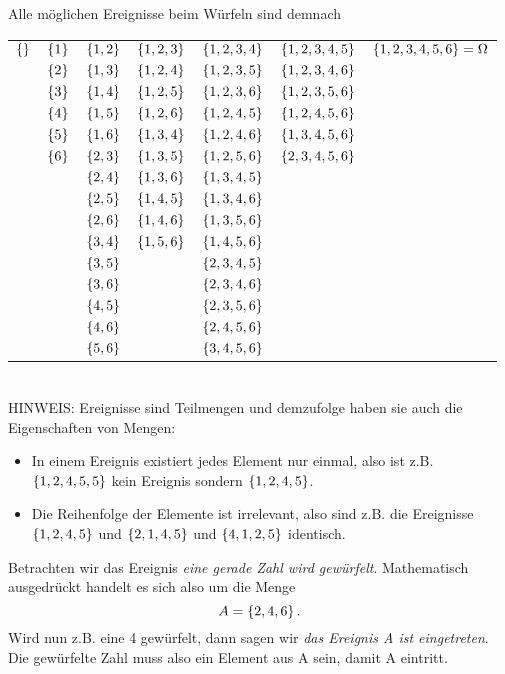 Alle möglichen Ereignisse beim Würfeln sind demnach

\begin{tabular}{ccccccc}\\\hline
$\gkl{}$&$\gkl{1}$& $\gkl{1,2}$ & $\gkl{1,2,3}$ & $\gkl{1,2,3,4}$ &  $\gkl{1,2,3,4,5}$ & $\gkl{1,2,3,4,5,6}=\Omega$\\
	 &$\gkl{2}$ & $\gkl{1,3}$& $\gkl{1,2,4}$& $\gkl{1,2,3,5}$& $\gkl{1,2,3,4,6}$ &\\
	 &$\gkl{3}$ & $\gkl{1,4}$& $\gkl{1,2,5}$& $\gkl{1,2,3,6}$& $\gkl{1,2,3,5,6}$&\\
	 &$\gkl{4}$ & $\gkl{1,5}$& $\gkl{1,2,6}$& $\gkl{1,2,4,5}$& $\gkl{1,2,4,5,6}$&\\
	 &$\gkl{5}$ & $\gkl{1,6}$ & $\gkl{1,3,4}$& $\gkl{1,2,4,6}$& $\gkl{1,3,4,5,6}$&\\ 
	 &$\gkl{6}$ & $\gkl{2,3}$& $\gkl{1,3,5}$& $\gkl{1,2,5,6}$& $\gkl{2,3,4,5,6}$&\\
	 &		 & $\gkl{2,4}$& $\gkl{1,3,6}$& $\gkl{1,3,4,5}$& &\\
	 &		 & $\gkl{2,5}$& $\gkl{1,4,5}$& $\gkl{1,3,4,6}$& &\\
	 &		 & $\gkl{2,6}$& $\gkl{1,4,6}$& $\gkl{1,3,5,6}$ & &\\
	 &		 & $\gkl{3,4}$& $\gkl{1,5,6}$& $\gkl{1,4,5,6}$& &\\ 
	  &		 & $\gkl{3,5}$& 			&$\gkl{2,3,4,5}$ & &\\
	 &		 & $\gkl{3,6}$& 			&$\gkl{2,3,4,6}$ & &\\
	 &		&  $\gkl{4,5}$& 			&$\gkl{2,3,5,6}$ & &\\
	 &		& $\gkl{4,6}$ & 			&$\gkl{2,4,5,6}$ & &\\
	 & 		& $\gkl{5,6}$& 			&$\gkl{3,4,5,6}$& &\\
	 \hline
\end{tabular}
\\

HINWEIS: Ereignisse sind Teilmengen und demzufolge haben sie auch die Eigenschaften von Mengen:
\begin{itemize}
	\item In einem Ereignis existiert jedes Element nur einmal, also ist z.B. $\gkl{1,2,4,5,5}$ kein Ereignis sondern $\gkl{1,2,4,5}$.
	\item Die Reihenfolge der Elemente ist irrelevant, also sind z.B. die Ereignisse $\gkl{1,2,4,5}$ und $\gkl{2,1,4,5}$ und $\gkl{4,1,2,5}$ identisch.
\end{itemize}

Betrachten wir das Ereignis \emph{eine gerade Zahl wird gewürfelt}. Mathematisch ausgedrückt handelt es sich also um die Menge $$A=\gkl{2,4,6}.$$ Wird nun z.B. eine 4 gewürfelt, dann sagen wir \emph{das Ereignis A ist eingetreten}. Die gewürfelte Zahl muss also ein Element aus A sein, damit A eintritt. 

